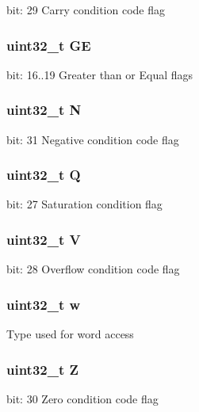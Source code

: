 bit\-: 29 Carry condition code flag \hypertarget{union_a_p_s_r___type_aa91800ec6e90e457c7a1acd1f2e17099}{
\subsubsection[{G\-E}]{\setlength{\rightskip}{0pt plus 5cm}uint32\-\_\-t G\-E}}\label{union_a_p_s_r___type_aa91800ec6e90e457c7a1acd1f2e17099}
bit\-: 16..19 Greater than or Equal flags \hypertarget{union_a_p_s_r___type_abae0610bc2a97bbf7f689e953e0b451f}{
\subsubsection[{N}]{\setlength{\rightskip}{0pt plus 5cm}uint32\-\_\-t N}}\label{union_a_p_s_r___type_abae0610bc2a97bbf7f689e953e0b451f}
bit\-: 31 Negative condition code flag \hypertarget{union_a_p_s_r___type_a65f27ddc4f7e09c14ce7c5211b2e000a}{
\subsubsection[{Q}]{\setlength{\rightskip}{0pt plus 5cm}uint32\-\_\-t Q}}\label{union_a_p_s_r___type_a65f27ddc4f7e09c14ce7c5211b2e000a}
bit\-: 27 Saturation condition flag \hypertarget{union_a_p_s_r___type_acd4a2b64faee91e4a9eef300667fa222}{
\subsubsection[{V}]{\setlength{\rightskip}{0pt plus 5cm}uint32\-\_\-t V}}\label{union_a_p_s_r___type_acd4a2b64faee91e4a9eef300667fa222}
bit\-: 28 Overflow condition code flag \hypertarget{union_a_p_s_r___type_ad0fb62e7a08e70fc5e0a76b67809f84b}{
\subsubsection[{w}]{\setlength{\rightskip}{0pt plus 5cm}uint32\-\_\-t w}}\label{union_a_p_s_r___type_ad0fb62e7a08e70fc5e0a76b67809f84b}
Type used for word access \hypertarget{union_a_p_s_r___type_a5ae954cbd9986cd64625d7fa00943c8e}{
\subsubsection[{Z}]{\setlength{\rightskip}{0pt plus 5cm}uint32\-\_\-t Z}}\label{union_a_p_s_r___type_a5ae954cbd9986cd64625d7fa00943c8e}
bit\-: 30 Zero condition code flag 

